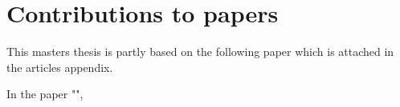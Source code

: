 \chapter*{Contributions to papers}

This masters thesis is partly based on the following paper which is attached in the articles appendix.

In the paper "\textbf{}", \lipsum[2]